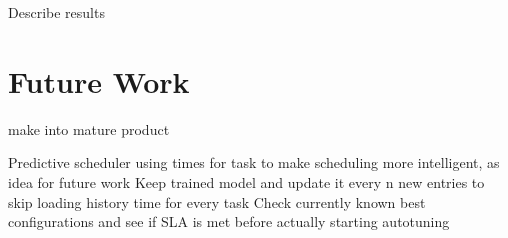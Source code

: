 Describe results

\section{Future Work}
make into mature product

Predictive scheduler using times for task to make scheduling more intelligent, as idea for future work
Keep trained model and update it every n new entries to skip loading history time for every task
Check currently known best configurations and see if SLA is met before actually starting autotuning